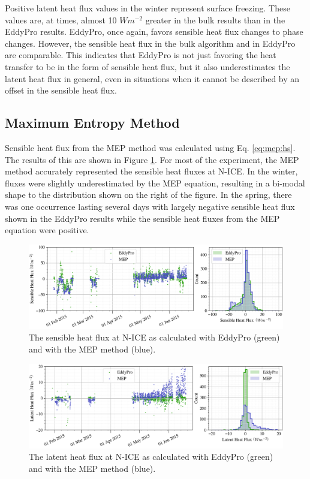 Positive latent heat flux values in the winter represent surface freezing. These values are, at times, almost 10 $Wm^{-2}$ greater in the bulk results than in the EddyPro results. EddyPro, once again, favors sensible heat flux changes to phase changes. However, the sensible heat flux in the bulk algorithm and in EddyPro are comparable. This indicates that EddyPro is not just favoring the heat transfer to be in the form of sensible heat flux, but it also underestimates the latent heat flux in general, even in situations when it cannot be described by an offset in the sensible heat flux. 

 \subsection{Maximum Entropy Method}
Sensible heat flux from the MEP method was calculated using Eq. \ref{eq:mep:hs}. The results of this are shown in Figure \ref{fig:mep:sensible}. For most of the experiment, the MEP method accurately represented the sensible heat fluxes at N-ICE. In the winter, fluxes were slightly underestimated by the MEP equation, resulting in a bi-modal shape to the distribution shown on the right of the figure. In the spring, there was one occurrence lasting several days with largely negative sensible heat flux shown in the EddyPro results while the sensible heat fluxes from the MEP equation were positive. 

\begin{figure}[h!]
    \centering
    \includegraphics[width=1\linewidth]{figures/chapter5/MEPSensible.png}
    \caption[Sensible heat flux from the MEP method compared to EddyPro.]{The sensible heat flux at N-ICE as calculated with EddyPro (green) and with the MEP method (blue).}
    \label{fig:mep:sensible}
\end{figure}
\begin{figure}[h!]
    \centering
    \includegraphics[width=1\linewidth]{figures/chapter5/MEPLatent.png}
    \caption[Latent heat flux from the MEP method compared to EddyPro.]{The latent heat flux at N-ICE as calculated with EddyPro (green) and with the MEP method (blue).}
    \label{fig:mep:latent}
\end{figure}

